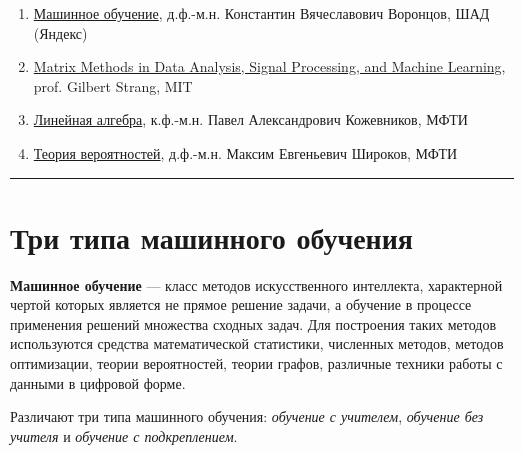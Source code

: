 \documentclass[11pt,a4paper]{article}
\providecommand{\tightlist}{%
      \setlength{\itemsep}{0pt}\setlength{\parskip}{0pt}}
\begin{document}
\begin{enumerate}
\def\labelenumi{\arabic{enumi}.}
\tightlist
\item
  \href{https://www.youtube.com/watch?v=SZkrxWhI5qM\&list=PLJOzdkh8T5krxc4HsHbB8g8f0hu7973fK\&index=1}{Машинное
  обучение}, д.ф.-м.н. Константин Вячеславович Воронцов, ШАД (Яндекс)
\item
  \href{https://www.youtube.com/watch?v=Cx5Z-OslNWE\&list=PLUl4u3cNGP63oMNUHXqIUcrkS2PivhN3k}{Matrix
  Methods in Data Analysis, Signal Processing, and Machine Learning},
  prof. Gilbert Strang, MIT
\item
  \href{https://www.youtube.com/watch?v=WNl10xl1QT8\&list=PLthfp5exSWEqSRXkZgMMzTSXL_WwMV9wK}{Линейная
  алгебра}, к.ф.-м.н. Павел Александрович Кожевников, МФТИ
\item
  \href{https://www.youtube.com/watch?v=Q3h9P7lhpNc\&list=PLyBWNG-pZKx7kLBRcNW3HXG05BDUrTQVr\&index=1}{Теория
  вероятностей}, д.ф.-м.н. Максим Евгеньевич Широков, МФТИ
\end{enumerate}

    \begin{center}\rule{0.5\linewidth}{0.5pt}\end{center}

    \hypertarget{ux442ux440ux438-ux442ux438ux43fux430-ux43cux430ux448ux438ux43dux43dux43eux433ux43e-ux43eux431ux443ux447ux435ux43dux438ux44f}{%
\section{Три типа машинного
обучения}\label{ux442ux440ux438-ux442ux438ux43fux430-ux43cux430ux448ux438ux43dux43dux43eux433ux43e-ux43eux431ux443ux447ux435ux43dux438ux44f}}

\textbf{Машинное обучение} --- класс методов искусственного интеллекта,
характерной чертой которых является не прямое решение задачи, а обучение
в процессе применения решений множества сходных задач. Для построения
таких методов используются средства математической статистики, численных
методов, методов оптимизации, теории вероятностей, теории графов,
различные техники работы с данными в цифровой форме.

Различают три типа машинного обучения: \emph{обучение с учителем},
\emph{обучение без учителя} и \emph{обучение с подкреплением}.
\end{document}
